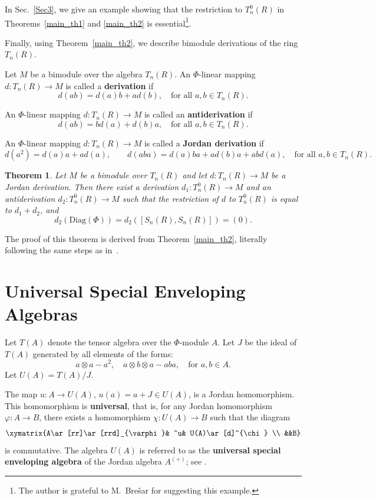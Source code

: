 \documentclass[12pt]{amsart}
\newtheorem{thm}{Theorem}
\begin{document}
{In Sec.~\ref{Sec3}, we give an example showing that the restriction to $T_n^0(R)$ in Theorems~\ref{main_th1} and \ref{main_th2} is essential\footnote{The author is grateful to M.~Bre\v{s}ar for suggesting this example.}.

Finally, using Theorem~\ref{main_th2}, we describe bimodule derivations of the ring $T_n(R).$

Let $M$ be a bimodule over the algebra $T_n(R)$.  
An $\Phi$-linear mapping $d : T_n(R) \to M$ is called a \textbf{derivation} 
if 
\[
d(ab) = d(a)b + a d(b), \quad \text{for all } a,b \in T_n(R).
\]

An $\Phi$-linear mapping $d : T_n(R) \to M$ is called an \textbf{antiderivation} 
if 
\[
d(ab) = b d(a) + d(b)a, \quad \text{for all } a,b \in T_n(R).
\]

An $\Phi$-linear mapping $d : T_n(R) \to M$ is called a \textbf{Jordan derivation} 
if 
\[
d(a^2) = d(a)a + a d(a), \qquad 
d(aba) = d(a)ba + a d(b)a + ab d(a) , 
\quad \text{for all } a,b \in T_n(R).
\]


\begin{thm}\label{main_th3}
	Let  $M$ be a bimodule over $T_n(R)$ and let $d : T_n(R) \to M$ be a Jordan derivation.  
	Then there exist a derivation $d_1 : T_n^0(R) \to M$ and an antiderivation $d_2 : T_n^0(R) \to M$ 
	such that the restriction of $d$ to $T_n^0(R)$ is equal to $d_1 + d_2$, and 
	\[
	d_2(\mathrm{Diag}(\Phi)) = d_2([S_n(R), S_n(R)]) = (0).
	\]
\end{thm}

The proof of this theorem is derived from Theorem~\ref{main_th2}, literally following the same steps as in~\cite{Benkovic}.
	
	
\section{Universal Special Enveloping Algebras}

Let $T(A)$ denote the tensor algebra over the $\Phi$-module $A$. Let $J$ be the ideal of $T(A)$ generated by all elements of the forms:
\[
a \otimes a - a^2,\quad a \otimes b \otimes a - aba,\quad \text{for } a, b \in A.
\]
Let  $U(A) = T(A) / J.$ 

The map \( u: A \to U(A) \), \( u(a) = a + J \in U(A) \),  
is a Jordan homomorphism. This homomorphism is  \textbf{universal}, that is,  
for any Jordan homomorphism \( \varphi: A \to B \),  
there exists a homomorphism \( \chi: U(A) \to B \) such that the diagram
$$
\xymatrix{A\ar[rr]\ar[rrd]_{\varphi}& ^u&
	U(A)\ar[d]^{\chi}
	\\ &&B} $$
is commutative. The algebra \( U(A) \) is referred to as the \textbf{universal special enveloping algebra}  
of the Jordan algebra \( A^{(+)} \); see \cite{Jacobson,McCrimmon2,ZhSShSh}.


}
\end{document}
